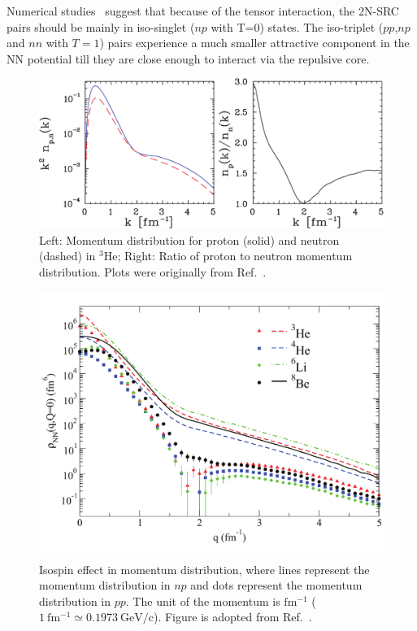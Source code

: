   Numerical studies~\cite{PhysRevC.72.054310} suggest that because of the tensor interaction, the 2N-SRC pairs should be mainly in iso-singlet ($np$ with T=0) states. The iso-triplet ($pp$,$np$ and $nn$ with $T=1$) pairs experience a much smaller attractive component in the NN potential till they are close enough to interact via the repulsive core.
 
\begin{figure}[!ht]
  \begin{center}
    \includegraphics[type=pdf,ext=.pdf,read=.pdf,width=0.90\linewidth]{./figures/physics/mom_dis_np_new}
    \caption[Momentum distribution for proton and neutron and their ratio]{\footnotesize{Left: Momentum distribution for proton (solid) and neutron (dashed) in $\mathrm{^{3}He}$; Right: Ratio of proton to neutron momentum distribution. Plots were originally from Ref.~\cite{Pieper_Wiringa}.}}
    \label{mom_dis_np}
  \end{center}
\end{figure}  
 
\begin{figure}[!ht]
  \begin{center}
    \includegraphics[type=pdf,ext=.pdf,read=.pdf,width=0.60\linewidth]{./figures/physics/isospin_src}
    \caption[Isospin effect in momentum distribution]{\footnotesize{Isospin effect in momentum distribution, where lines represent the momentum distribution in $np$ and dots represent the momentum distribution in $pp$. The unit of the momentum is $\mathrm{fm^{-1}}$ ($\mathrm{1~fm^{-1}\simeq 0.1973~GeV/c}$). Figure is adopted from Ref.~\cite{PhysRevLett.98.132501}.}}
    \label{isospin_src}
  \end{center}
\end{figure} 

